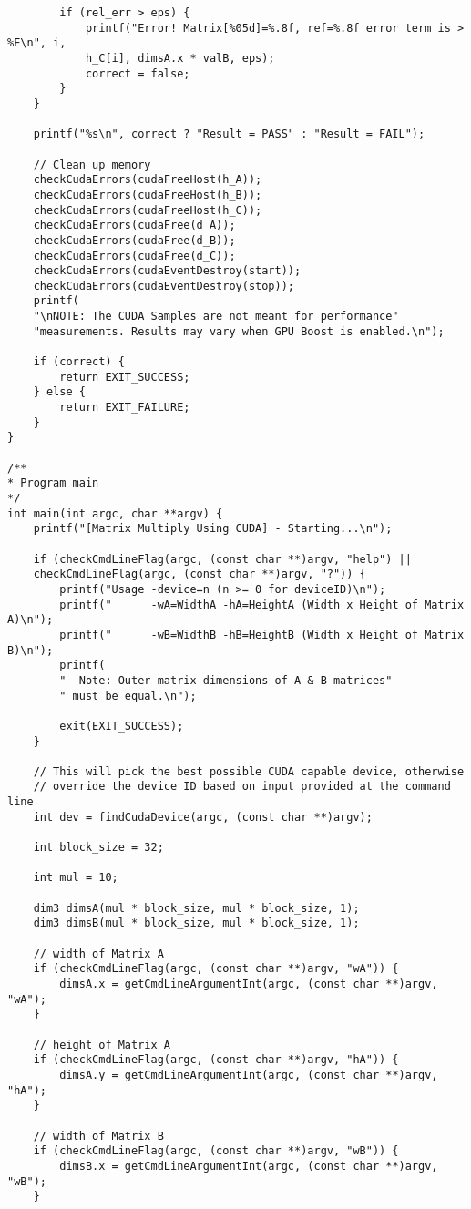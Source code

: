 \begin{lstlisting}
		if (rel_err > eps) {
			printf("Error! Matrix[%05d]=%.8f, ref=%.8f error term is > %E\n", i,
			h_C[i], dimsA.x * valB, eps);
			correct = false;
		}
	}
	
	printf("%s\n", correct ? "Result = PASS" : "Result = FAIL");
	
	// Clean up memory
	checkCudaErrors(cudaFreeHost(h_A));
	checkCudaErrors(cudaFreeHost(h_B));
	checkCudaErrors(cudaFreeHost(h_C));
	checkCudaErrors(cudaFree(d_A));
	checkCudaErrors(cudaFree(d_B));
	checkCudaErrors(cudaFree(d_C));
	checkCudaErrors(cudaEventDestroy(start));
	checkCudaErrors(cudaEventDestroy(stop));
	printf(
	"\nNOTE: The CUDA Samples are not meant for performance"
	"measurements. Results may vary when GPU Boost is enabled.\n");
	
	if (correct) {
		return EXIT_SUCCESS;
	} else {
		return EXIT_FAILURE;
	}
}

/**
* Program main
*/
int main(int argc, char **argv) {
	printf("[Matrix Multiply Using CUDA] - Starting...\n");
	
	if (checkCmdLineFlag(argc, (const char **)argv, "help") ||
	checkCmdLineFlag(argc, (const char **)argv, "?")) {
		printf("Usage -device=n (n >= 0 for deviceID)\n");
		printf("      -wA=WidthA -hA=HeightA (Width x Height of Matrix A)\n");
		printf("      -wB=WidthB -hB=HeightB (Width x Height of Matrix B)\n");
		printf(
		"  Note: Outer matrix dimensions of A & B matrices"
		" must be equal.\n");
		
		exit(EXIT_SUCCESS);
	}
	
	// This will pick the best possible CUDA capable device, otherwise
	// override the device ID based on input provided at the command line
	int dev = findCudaDevice(argc, (const char **)argv);
	
	int block_size = 32;
	
	int mul = 10;
	
	dim3 dimsA(mul * block_size, mul * block_size, 1);
	dim3 dimsB(mul * block_size, mul * block_size, 1);
	
	// width of Matrix A
	if (checkCmdLineFlag(argc, (const char **)argv, "wA")) {
		dimsA.x = getCmdLineArgumentInt(argc, (const char **)argv, "wA");
	}
	
	// height of Matrix A
	if (checkCmdLineFlag(argc, (const char **)argv, "hA")) {
		dimsA.y = getCmdLineArgumentInt(argc, (const char **)argv, "hA");
	}
	
	// width of Matrix B
	if (checkCmdLineFlag(argc, (const char **)argv, "wB")) {
		dimsB.x = getCmdLineArgumentInt(argc, (const char **)argv, "wB");
	}
	

\end{lstlisting}
